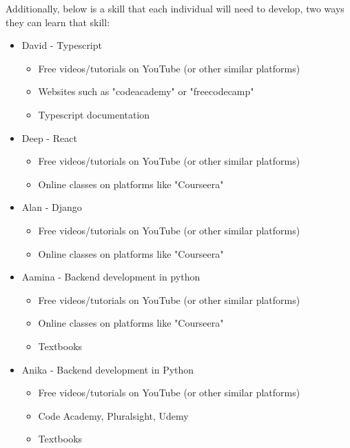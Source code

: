 \documentclass[12pt, titlepage]{article}
\begin{document}
Additionally, below is a skill that each individual will need to develop, two ways they can learn that skill:\\
\begin{itemize}
    \item David - Typescript
    \begin{itemize}
        \item Free videos/tutorials on YouTube (or other similar platforms)
        \item Websites such as "codeacademy" or "freecodecamp"
        \item Typescript documentation
    \end{itemize}
    \item Deep - React
    \begin{itemize}
        \item Free videos/tutorials on YouTube (or other similar platforms)
        \item Online classes on platforms like "Courseera"
    \end{itemize}
    \item Alan - Django
    \begin{itemize}
        \item Free videos/tutorials on YouTube (or other similar platforms)
        \item Online classes on platforms like "Courseera"
    \end{itemize}
    \item Aamina - Backend development in python
    \begin{itemize}
        \item Free videos/tutorials on YouTube (or other similar platforms)
        \item Online classes on platforms like "Courseera"
        \item Textbooks
    \end{itemize}
    \item Anika - Backend development in Python
    \begin{itemize}
        \item Free videos/tutorials on YouTube (or other similar platforms)
        \item Code Academy, Pluralsight, Udemy
        \item Textbooks
    \end{itemize}
\end{itemize}
\end{document}
